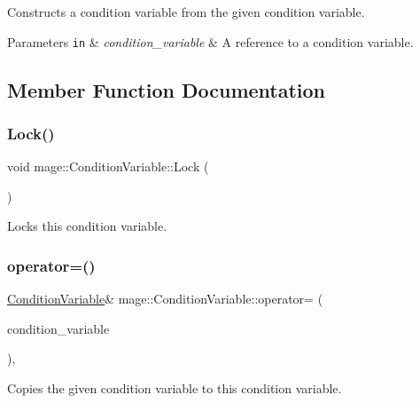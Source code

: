 Constructs a condition variable from the given condition variable.


\begin{DoxyParams}[1]{Parameters}
\mbox{\tt in}  & {\em condition\+\_\+variable} & A reference to a condition variable. \\
\hline
\end{DoxyParams}


\subsection{Member Function Documentation}
\hypertarget{classmage_1_1_condition_variable_acb0fa4a842b6979ac35c70dab0f43813}{}\label{classmage_1_1_condition_variable_acb0fa4a842b6979ac35c70dab0f43813} 
\subsubsection{\texorpdfstring{Lock()}{Lock()}}
{\footnotesize\ttfamily void mage\+::\+Condition\+Variable\+::\+Lock (\begin{DoxyParamCaption}{ }\end{DoxyParamCaption})}

Locks this condition variable. \hypertarget{classmage_1_1_condition_variable_ac83eae5353cd004ee06fe2376e5bdbf4}{}\label{classmage_1_1_condition_variable_ac83eae5353cd004ee06fe2376e5bdbf4} 
\subsubsection{\texorpdfstring{operator=()}{operator=()}}
{\footnotesize\ttfamily \hyperlink{classmage_1_1_condition_variable}{Condition\+Variable}\& mage\+::\+Condition\+Variable\+::operator= (\begin{DoxyParamCaption}\item[{const \hyperlink{classmage_1_1_condition_variable}{Condition\+Variable} \&}]{condition\+\_\+variable }\end{DoxyParamCaption})\hspace{0.3cm}{\ttfamily [private]}, {\ttfamily [delete]}}

Copies the given condition variable to this condition variable.


